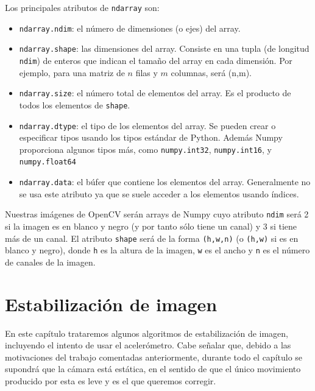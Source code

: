 \documentclass[a4paper,openright, 12pt]{book}
\begin{document}
Los principales atributos de \lstinline|ndarray| son:
 \begin{itemize}
\item \lstinline|ndarray.ndim|: el número de dimensiones (o ejes) del array.
 
\item \lstinline|ndarray.shape|: las dimensiones del array. Consiste en una tupla (de longitud \lstinline|ndim|) de enteros que indican el tamaño del array en cada dimensión. Por ejemplo, para una matriz de $n$ filas y $m$ columnas, será (n,m).

\item  \lstinline|ndarray.size|: el número total de elementos del array. Es el producto de todos los elementos de \lstinline|shape|. 

\item\lstinline|ndarray.dtype|: el tipo de los elementos del array. Se pueden crear o especificar tipos usando los tipos estándar de Python. Además Numpy proporciona algunos tipos más, como \lstinline|numpy.int32|, \lstinline|numpy.int16|, y \lstinline|numpy.float64|

\item \lstinline|ndarray.data|: el búfer que contiene los elementos del array. Generalmente no se usa este atributo ya que se suele acceder a los elementos usando índices.
 \end{itemize}
Nuestras imágenes de OpenCV serán arrays de Numpy cuyo atributo \lstinline|ndim| será 2 si la imagen es en blanco y negro (y por tanto sólo tiene un canal) y 3 si tiene más de un canal.
El atributo \lstinline|shape| será de la forma \lstinline|(h,w,n)| (o \lstinline|(h,w)| si es en blanco y negro), donde \lstinline|h| es la altura de la imagen, \lstinline|w| es el ancho y \lstinline|n| es el número de canales de la imagen.
\chapter{Estabilización de imagen}\label{cap.estab}
En este capítulo trataremos algunos algoritmos de estabilización de imagen, incluyendo el intento de usar el acelerómetro.
Cabe señalar que, debido a las motivaciones del trabajo comentadas anteriormente, durante todo el capítulo se supondrá que la cámara está estática, en el sentido de que el único movimiento producido por esta es leve y es el que queremos corregir.
\end{document}
